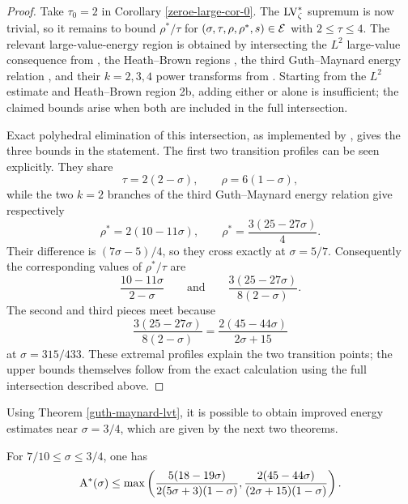\begin{proof}
Take $\tau_0=2$ in Corollary \ref{zeroe-large-cor-0}. The $\mathrm{LV}^*_{\zeta}$ supremum is now trivial, so it remains to bound $\rho^*/\tau$ for $(\sigma,\tau,\rho,\rho^*,s)\in\mathcal{E}$ with $2\leq\tau\leq4$. The relevant large-value-energy region is obtained by intersecting the $L^2$ large-value consequence from , the Heath--Brown regions , the third Guth--Maynard energy relation , and their $k=2,3,4$ power transforms from . Starting from the $L^2$ estimate and Heath--Brown region 2b, adding either  or  alone is insufficient; the claimed bounds arise when both are included in the full intersection.

Exact polyhedral elimination of this intersection, as implemented by , gives the three bounds in the statement. The first two transition profiles can be seen explicitly. They share
\[
\tau=2(2-\sigma), \qquad \rho=6(1-\sigma),
\]
while the two $k=2$ branches of the third Guth--Maynard energy relation give respectively
\[
\rho^*=2(10-11\sigma), \qquad \rho^*=\frac{3(25-27\sigma)}{4}.
\]
Their difference is $(7\sigma-5)/4$, so they cross exactly at $\sigma=5/7$. Consequently the corresponding values of $\rho^*/\tau$ are
\[
\frac{10-11\sigma}{2-\sigma}
\qquad\text{and}\qquad
\frac{3(25-27\sigma)}{8(2-\sigma)}.
\]
The second and third pieces meet because
\[
\frac{3(25-27\sigma)}{8(2-\sigma)}
=\frac{2(45-44\sigma)}{2\sigma+15}
\]
at $\sigma=315/433$. These extremal profiles explain the two transition points; the upper bounds themselves follow from the exact calculation using the full intersection described above.
\end{proof}

Using Theorem \ref{guth-maynard-lvt}, it is possible to obtain improved energy estimates near $\sigma = 3/4$, which are given by the next two theorems.

\begin{theorem}\label{imp-energy-bound2}
For $7/10 \le \sigma \le 3/4$, one has
\[
\mathrm{A}^*(\sigma) \le \max\left(\frac{5(18 - 19\sigma)}{2(5\sigma + 3)(1 - \sigma)}, \frac{2(45 - 44\sigma)}{(2\sigma + 15)(1
- \sigma)}\right).
\]
\end{theorem}

\derived
{}

